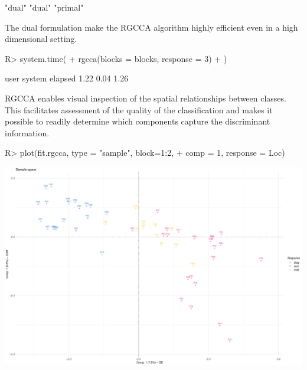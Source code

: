 \documentclass[
]{jss}
\begin{document}
\footnotesize

\begin{CodeChunk}
\begin{CodeOutput}
[1] "dual"   "dual"   "primal"
\end{CodeOutput}
\end{CodeChunk}

\normalsize

The dual formulation make the RGCCA algorithm highly efficient even in a
high dimensional setting.

\footnotesize

\begin{CodeChunk}
\begin{CodeInput}
R> system.time(
+   rgcca(blocks = blocks, response = 3)
+ )
\end{CodeInput}
\begin{CodeOutput}
   user  system elapsed 
   1.22    0.04    1.26 
\end{CodeOutput}
\end{CodeChunk}

\normalsize

RGCCA enables visual inspection of the spatial relationships between
classes. This facilitates assessment of the quality of the
classification and makes it possible to readily determine which
components capture the discriminant information.

\footnotesize

\begin{CodeChunk}
\begin{CodeInput}
R> plot(fit.rgcca, type = "sample", block=1:2,
+      comp = 1, response = Loc)
\end{CodeInput}


\begin{center}\includegraphics{RGCCA_21022023_files/figure-latex/unnamed-chunk-37-1} \end{center}

\end{CodeChunk}
\end{document}
